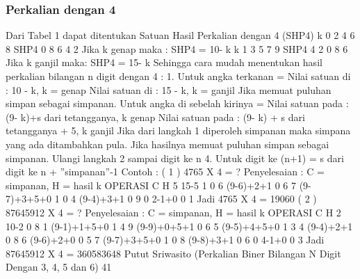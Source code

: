 \subsubsection {Perkalian dengan 4}
Dari Tabel 1 dapat ditentukan
Satuan Hasil Perkalian dengan 4 (SHP4)
k 0 2 4 6 8
SHP4 0 8 6 4 2
Jika k genap maka :
SHP4 = 10- k
k 1 3 5 7 9
SHP4 4 2 0 8 6
Jika k ganjil maka:
SHP4 = 15- k
Sehingga cara mudah menentukan hasil
perkalian bilangan n digit dengan 4 :
1. Untuk angka terkanan =
Nilai satuan di : 10 - k, k = genap
Nilai satuan di : 15 - k, k = ganjil
Jika memuat puluhan simpan sebagai
\”simpanan. Untuk angka di sebelah kirinya =
Nilai satuan pada : (9- k)+\”s\” dari
tetangganya, k genap
Nilai satuan pada : (9- k) + \“s\” dari
tetangganya + 5, k ganjil
Jika dari langkah 1 diperoleh
\“simpanan\” maka \“simpana\’ yang ada
ditambahkan pula.
Jika hasilnya memuat puluhan simpan
sebagai \”simpanan. Ulangi langkah 2 sampai digit ke n
4. Untuk digit ke (n+1) =
\”s\” dari digit ke n + ”simpanan”-1
Contoh :
( 1 ) 4765 X 4 = ?
Penyelesaian :
C = \”simpanan\”, H = hasil
k OPERASI C H
5 15-5 1 0
6 (9-6)+2+1 0 6
7 (9-7)+3+5+0 1 0
4 (9-4)+3+1 0 9
0 2-1+0 0 1
Jadi 4765 X 4 = 19060
( 2 ) 87645912 X 4 = ?
Penyelesaian :
C = \”simpanan\”, H = hasil
k OPERASI C H
2 10-2 0 8
1 (9-1)+1+5+0 1 4
9 (9-9)+0+5+1 0 6
5 (9-5)+4+5+0 1 3
4 (9-4)+2+1 0 8
6 (9-6)+2+0 0 5
7 (9-7)+3+5+0 1 0
8 (9-8)+3+1 0 6
0 4-1+0 0 3
Jadi 87645912 X 4 = 360583648
Putut Sriwasito (Perkalian Biner Bilangan N Digit Dengan 3, 4, 5 dan 6)
41

